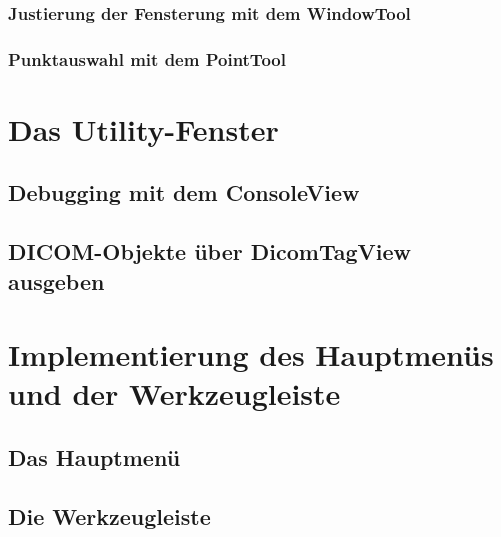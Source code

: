 \subsubsection{Justierung der Fensterung mit dem WindowTool}

\subsubsection{Punktauswahl mit dem PointTool}

\section{Das Utility-Fenster}

\subsection{Debugging mit dem ConsoleView}

\subsection{DICOM-Objekte über DicomTagView ausgeben}

\section{Implementierung des Hauptmenüs und der Werkzeugleiste}

\subsection{Das Hauptmenü}

\subsection{Die Werkzeugleiste}



